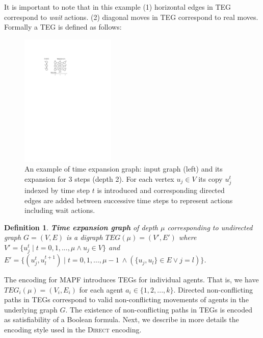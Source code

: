 \documentclass[jair,oneside,11pt]{article}
\newtheorem{definition}{Definition}
\begin{document}
It is important to note that in this example (1) horizontal edges in TEG correspond to {\em wait} actions. (2) diagonal moves in TEG correspond to real moves. Formally a TEG is defined as follows:

\begin{figure}
\begin{center}
\includegraphics[trim={4.5cm 21.0cm 10.5cm 4.5cm},clip,width=0.4\textwidth]{fig_TEG.pdf}
\end{center}
\caption{An example of time expansion graph: input graph (left) and its expansion for 3 steps (depth 2). For each vertex $u_j \in V$ its copy $u_j^t$ indexed by time step $t$ is introduced and corresponding directed edges are added between successive time steps to represent actions including wait actions. } \label{figure-TEG}
\end{figure}

\begin{definition}
{\bf Time expansion graph} of depth $\mu$ corresponding to undirected graph $G=(V,E)$ is a digraph $\mathit{TEG}(\mu)=(V',E')$ where
$V'=\{u^t_j \;|\; t=0,1,...,\mu \wedge u_j \in V\}$ and $E'=\{{(u_j^t,u_l^{t+1})}\;|\; t=0,1,...,\mu-1\ \wedge (\{u_j,u_l\} \in E
\vee j=l) \}$. \label{def:TEG}
\end{definition}

The encoding for MAPF introduces TEGs for individual agents. That is, we have $TEG_i(\mu)=(V_i,E_i)$ for each agent $a_i \in \{1,2,...,k\}$. Directed non-conflicting paths in TEGs correspond to valid non-conflicting movements of agents in the underlying graph $G$. The existence of non-conflicting paths in TEGs is encoded as satisfiability of a Boolean formula. Next, we describe in more details the encoding style used in the \textsc{Direct} encoding.
\end{document}
